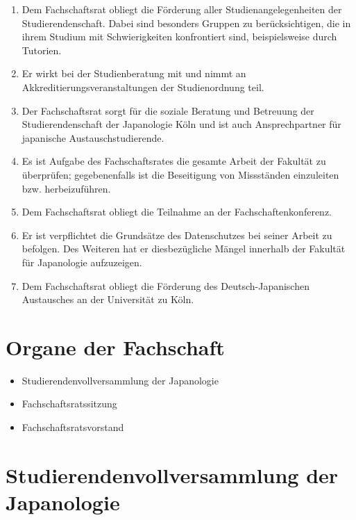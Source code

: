 \documentclass[12pt]{scrartcl}
\begin{document}
\begin{enumerate}
	\item Dem Fachschaftsrat obliegt die Förderung aller Studienangelegenheiten der Studierendenschaft. Dabei sind besonders Gruppen zu berücksichtigen, die in ihrem Studium mit Schwierigkeiten konfrontiert sind, beispielsweise durch Tutorien.
	\item Er wirkt bei der Studienberatung mit und nimmt an Akkreditierungsveranstaltungen der Studienordnung teil.
	\item Der Fachschaftsrat sorgt für die soziale Beratung und Betreuung der Studierendenschaft der Japanologie Köln und ist auch Ansprechpartner für japanische Austauschstudierende.
	\item Es ist Aufgabe des Fachschaftsrates die gesamte Arbeit der Fakultät zu überprüfen; gegebenenfalls ist die Beseitigung von Missständen einzuleiten bzw. herbeizuführen.
	\item Dem Fachschaftsrat obliegt die Teilnahme an der Fachschaftenkonferenz.
	\item Er ist verpflichtet die Grundsätze des Datenschutzes bei seiner Arbeit zu befolgen. Des Weiteren hat er diesbezügliche Mängel innerhalb der Fakultät für Japanologie aufzuzeigen.
	\item Dem Fachschaftsrat obliegt die Förderung des Deutsch-Japanischen Austausches an der Universität zu Köln.
\end{enumerate}

\section{Organe der Fachschaft}

\begin{itemize}
	\item Studierendenvollversammlung der Japanologie
	\item Fachschaftsratssitzung
	\item Fachschaftsratsvorstand
\end{itemize}

\section{Studierendenvollversammlung der Japanologie}
\label{par:assembly}
\end{document}
